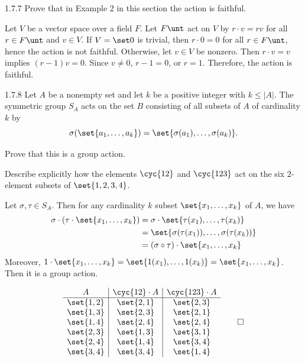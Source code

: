 \begin{exercise}{1.7.7}
    Prove that in Example 2 in this section the action is faithful.
\end{exercise}

\begin{sol}
    Let $V$ be a vector space over a field $F$.
	Let $F\unt$ act on $V$ by $r \cdot v = rv$ for all $r \in F\unt$ and $v \in V$.
	If $V = \set 0$ is trivial, then $r \cdot 0 = 0$ for all $r \in F\unt$, hence the action is not faithful.
	Otherwise, let $v \in V$ be nonzero.
	Then $r \cdot v = v$ implies $(r - 1)v = 0$.
	Since $v \neq 0$, $r - 1 = 0$, or $r = 1$.
	Therefore, the action is faithful.
\end{sol}

\begin{exercise}{1.7.8}
    Let $A$ be a nonempty set and let $k$ be a positive integer with $k\le |A|$.
	The symmetric group $S_A$ acts on the set $B$ consisting of all subsets of $A$ of cardinality $k$ by
    \[
    	\sigma(\set{a_1, \dots, a_k}) = \set{\sigma(a_1), \dots, \sigma(a_k)}.
    \]
    \begin{subexercises}
        \item Prove that this is a group action.
        \item Describe explicitly how the elements $\cyc{1 2}$ and $\cyc{1 2 3}$ act on the six $2$-element subsets of $\set{1,2,3,4}$.
    \end{subexercises}
\end{exercise}

\begin{solenum}
    \item Let $\sigma, \tau \in S_A$.
	Then for any cardinality $k$ subset $\set{x_1, \ldots, x_k}$ of $A$, we have
    \begin{align*}
        \sigma \cdot (\tau \cdot \set{x_1, \ldots, x_k}) & = \sigma \cdot \set{\tau(x_1), \ldots, \tau(x_k)} \\
        & = \set{\sigma(\tau(x_1)), \ldots, \sigma(\tau(x_k))} \\
        & = (\sigma \circ \tau) \cdot \set{x_1, \ldots, x_k}
    \end{align*}
    Moreover, $1 \cdot \set{x_1, \ldots, x_k} = \set{1(x_1), \ldots, 1(x_k)} = \set{x_1, \ldots, x_k}$.
	Then it is a group action.
    \item
    \[
        \begin{array}{c|c|c}
            A & \cyc{1 2} \cdot A & \cyc{1 2 3} \cdot A \\
            \hline
            \set{1, 2} & \set{2, 1} & \set{2, 3} \\
            \set{1, 3} & \set{2, 3} & \set{2, 1} \\
            \set{1, 4} & \set{2, 4} & \set{2, 4} \\
            \set{2, 3} & \set{1, 3} & \set{3, 1} \\
            \set{2, 4} & \set{1, 4} & \set{3, 4} \\
            \set{3, 4} & \set{3, 4} & \set{1, 4}
        \end{array} \qedhere
    \]
\end{solenum}

